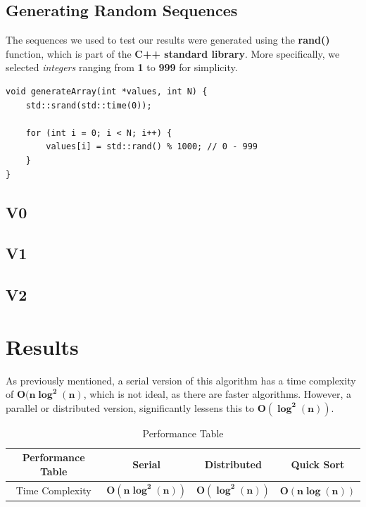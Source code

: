 \documentclass[12pt]{report}
\begin{document}
\section{Generating Random Sequences}
The sequences we used to test our results were generated using the \textbf{rand()} function, which is part of the \textbf{C++ standard library}. More specifically, we selected \textit{integers} ranging from \textbf{1} to \textbf{999} for simplicity.
\begin{lstlisting}[style=cppstyle]
void generateArray(int *values, int N) {
    std::srand(std::time(0));

    for (int i = 0; i < N; i++) {
        values[i] = std::rand() % 1000; // 0 - 999
    }
}
\end{lstlisting}


\section{V0}

\section{V1}

\section{V2}

\chapter{Results}
As previously mentioned, a serial version of this algorithm has a time complexity of $\boldsymbol{O(n \log^2(n)}$, which is not ideal, as there are faster algorithms. However, a parallel or distributed version, significantly lessens this to $\boldsymbol{O(\log^2(n))}$.

\begin{table}[h!]
    \centering
    \begin{tabular}{|c|c|c|c|}
        \hline
        \rule{0pt}{3ex}\textbf{Performance Table} & \textbf{Serial}                 & \textbf{Distributed}          & \textbf{Quick Sort}          \\ \hline
        \rule{0pt}{3ex}Time Complexity            & \(\boldsymbol{O(n \log^2(n))}\) & \(\boldsymbol{O(\log^2(n))}\) & \(\boldsymbol{O(n\log(n))}\) \\ \hline
    \end{tabular}
    \caption{Performance Table}
    \label{tab:simple_table}
\end{table}
\end{document}
